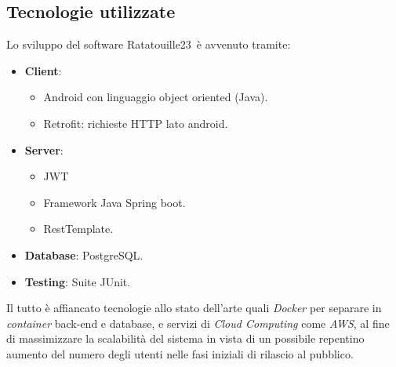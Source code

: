 \subsection{Tecnologie utilizzate}
Lo sviluppo del software Ratatouille23\texttrademark \ è avvenuto tramite:
\begin{itemize}
    \item \textbf{Client}:
          \begin{itemize}
              \item Android con linguaggio object oriented (Java).
              \item Retrofit: richieste HTTP lato android.
          \end{itemize}
    \item \textbf{Server}:
          \begin{itemize}
              \item JWT
              \item Framework Java Spring boot.
              \item RestTemplate.
          \end{itemize}
    \item \textbf{Database}: PostgreSQL.
    \item \textbf{Testing}: Suite JUnit.
\end{itemize}
Il tutto è affiancato tecnologie allo stato dell'arte quali \textit{Docker} per separare in \textit{container} back-end e database, e servizi di \textit{Cloud Computing} come \textit{AWS},
al fine di massimizzare la scalabilità del sistema in vista di un possibile repentino aumento del numero degli utenti nelle fasi
iniziali di rilascio al pubblico.